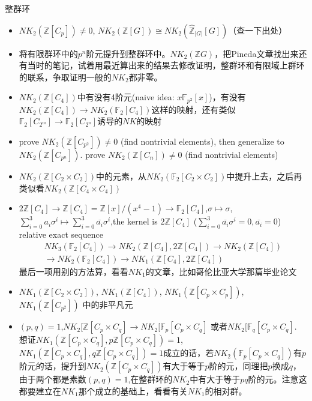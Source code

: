 整群环
\begin{itemize}
	\item $NK_2(\mathbb{Z}[C_p])\neq 0$, $NK_2(\mathbb{Z}[G])\cong NK_2(\hat{\mathbb{Z}}_{|G|}[G])$（查一下出处）
	\item 将有限群环中的$p^n$阶元提升到整群环中。$NK_2(\mathbb{Z}G)$，把Pineda文章找出来还有当时的笔记，试着用最近算出来的结果去修改证明，整群环和有限域上群环的联系，争取证明一般的$NK_2$都非零。
	\item $NK_2(\mathbb{Z}[C_4])$中有没有4阶元(naive idea: $x\mathbb{F}_{p^2}[x]$)，有没有$NK_2(\mathbb{Z}[C_4])\longrightarrow NK_2(\mathbb{F}_2[C_4])$这样的映射，还有类似$\mathbb{F}_2[C_{2^m}]\longrightarrow \mathbb{F}_2[C_{2^n}]$诱导的$NK$的映射
	\item prove $NK_2(\mathbb{Z}[C_{p^2}])\neq 0$ (find nontrivial elements), then generalize to $NK_2(\mathbb{Z}[C_{p^n}])$. prove $NK_2(\mathbb{Z}[C_{n}])\neq 0$ (find nontrivial elements)
	\item $NK_2(\mathbb{Z}[C_2\times C_2])$中的元素，从$NK_2(\mathbb{F}_2[C_2\times C_2])$中提升上去，之后再类似看$NK_2(\mathbb{Z}[C_4\times C_4])$
	\item $2\mathbb{Z}[C_4]\longrightarrow \mathbb{Z}[C_4]=\mathbb{Z}[x]/(x^4-1)\longrightarrow \mathbb{F}_2[C_4]$,$\sigma \mapsto \sigma$,$\sum_{i=0}^3a_i \sigma^i \mapsto \sum_{i=0}^3\overline{a_i} \sigma^i$,the kernel is $2\mathbb{Z}[C_4]$  ($\sum_{i=0}^3\overline{a_i} \sigma^i=0, \overline{a_i}=0$) relative exact sequence
	\begin{gather*}
		NK_3(\mathbb{F}_2[C_4])\longrightarrow  NK_2(\mathbb{Z}[C_4],2\mathbb{Z}[C_4])\longrightarrow NK_2(\mathbb{Z}[C_4])\\
	\longrightarrow NK_2(\mathbb{F}_2[C_4])\longrightarrow NK_1(\mathbb{Z}[C_4],2\mathbb{Z}[C_4])
	\end{gather*}
	最后一项用别的方法算，看看$NK_1$的文章，比如哥伦比亚大学那篇毕业论文
	\item $NK_1(\mathbb{Z}[C_2\times C_2])$, $NK_1(\mathbb{Z}[C_4])$, $NK_1(\mathbb{Z}[C_p\times C_p])$, $NK_1(\mathbb{Z}[C_{p^2}])$ 中的非平凡元
	\item $(p,q)=1$,$NK_2[\mathbb{Z}[C_p\times C_q] \longrightarrow  NK_2[\mathbb{F}_p[C_p\times C_q]$ 或者$NK_2[\mathbb{F}_q[C_p\times C_q]$.
	想证$NK_1(\mathbb{Z}[C_p\times C_q],p\mathbb{Z}[C_p\times C_q])=1$, $NK_1(\mathbb{Z}[C_p\times C_q],q\mathbb{Z}[C_p\times C_q])=1$成立的话，若$NK_2(\mathbb{F}_p[C_p\times C_q])$有$p$阶元的话，提升到$NK_2(\mathbb{Z}[C_p\times C_q])$有大于等于$p$阶的元，同理把$p$换成$q$，由于两个都是素数$(p,q)=1$,在整群环的$NK_2$中有大于等于$pq$阶的元。注意这都要建立在$NK_1$那个成立的基础上，看看有关$NK_1$的相对群。

\end{itemize}
